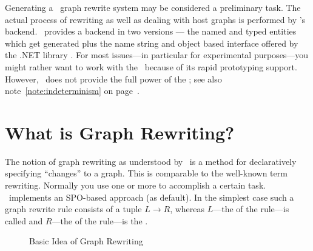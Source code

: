Generating a \GrG\ graph rewrite system may be considered a preliminary task.
The actual process of rewriting as well as dealing with host graphs is performed by \GrG's backend.
\GrG\ provides a backend  in two versions --- the named and typed entities which get generated plus the name string and object based interface offered by the .NET library \LibGr.
For most issues---in particular for experimental purposes---you might rather want to work with the \GrShell\ because of its rapid prototyping support.
However, \GrShell\ does not provide the full power of the \LibGr; see also note~\ref{note:indeterminism} on page~\pageref{note:indeterminism}.


\section{What is Graph Rewriting?}
\label{ov:whatsallabout}

The notion of graph rewriting as understood by \GrG\ is a method for declaratively specifying ``changes'' to a graph.
This is comparable to the well-known term rewriting.
Normally you use one or more  to accomplish a certain task.
\GrG\ implements an SPO-based approach (as default).
In the simplest case such a graph rewrite rule consists of a tuple $L \rightarrow R$, whereas $L$---the  of the rule---is called  and $R$---the  of the rule---is the .

\begin{figure}[htbp]
	\centering
  \caption{Basic Idea of Graph Rewriting}
  \label{figrule}
\end{figure}

